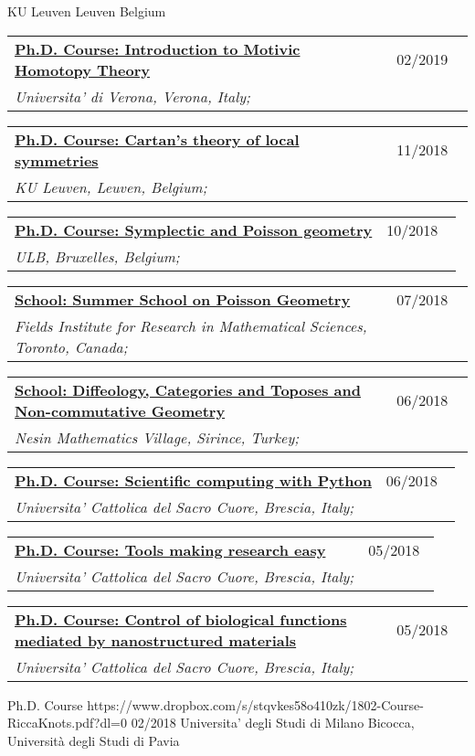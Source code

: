\documentclass[a4paper]{article}
\newcommand{\longvoice}[8]{
    \begin{tabular}{p{0.83\linewidth} p{0.17\linewidth} }
        \textbf{\href{#3}{#2: #1}} & #4 
        \\ 
        \textit{#5, #6, #7;} & {\small\emph{#8}}
    \end{tabular}
    \vspace{.5em}
}
\begin{document}
        {KU Leuven}
        {Leuven}
        {Belgium}
        {}
    \longvoice{Introduction to Motivic Homotopy Theory}
        {Ph.D. Course}
        {https://www.dropbox.com/s/fpqd1xsz4g8ecu4/1902-Verona-MotivicHomotopy.pdf?dl=0}
        {02/2019}
        {Universita' di Verona}
        {Verona}
        {Italy}
        {}
    \longvoice{Cartan's theory of local symmetries}
        {Ph.D. Course}
        {https://wis.kuleuven.be/methusalem-pure-math/methusalem-lecture-series/methusalem-lecture-series}
        {11/2018}
        {KU Leuven}
        {Leuven}
        {Belgium}
        {}
    \longvoice{Symplectic and Poisson geometry}
        {Ph.D. Course}
        {https://web.archive.org/web/20190831102514/http://homepages.ulb.ac.be/~rklaasse/symplecticpoissongeometry.html}
        {10/2018}
        {ULB}
        {Bruxelles}
        {Belgium}
        {}
    \longvoice{Summer School on Poisson Geometry}
        {School}
        {https://web.archive.org/web/20190831105310/http://www.fields.utoronto.ca/activities/18-19/poisson-summer-school}
        {07/2018}
        {Fields Institute for Research in Mathematical Sciences}
        {Toronto}
        {Canada}
        {}
    \longvoice{Diffeology, Categories and Toposes and Non-commutative Geometry}
        {School}
        {https://web.archive.org/web/20171123204026/http://www.nesinkoyleri.org/eng/events-detail.php?egitimkod=203\#icerikler}
        {06/2018}
        {Nesin Mathematics Village}
        {Sirince}
        {Turkey}
        {}
    \longvoice{Scientific computing with Python}
        {Ph.D. Course}
        {https://web.archive.org/web/20180604081514/http://dmf.unicatt.it/~della/pythoncourse18/}
        {06/2018}
        {Universita' Cattolica del Sacro Cuore}
        {Brescia}
        {Italy}
        {}
    \longvoice{Tools making research easy}
        {Ph.D. Course}
        {https://web.archive.org/web/20180604080852/http://www.dmf.unicatt.it/kropf/scientifictools18.html}
        {05/2018}
        {Universita' Cattolica del Sacro Cuore}
        {Brescia}
        {Italy}
        {}
    \longvoice{Control of biological functions mediated by nanostructured materials}
        {Ph.D. Course}
        {https://www.dropbox.com/s/8udz4zmfaxr9xb8/1805-Course-Ciofani.pdf?dl=0}
        {05/2018}
        {Universita' Cattolica del Sacro Cuore}
        {Brescia}
        {Italy}
        {}
        {Ph.D. Course}
        {https://www.dropbox.com/s/stqvkes58o410zk/1802-Course-RiccaKnots.pdf?dl=0}
        {02/2018}
        {Universita' degli Studi di Milano Bicocca, Università degli Studi di Pavia}
\end{document}
